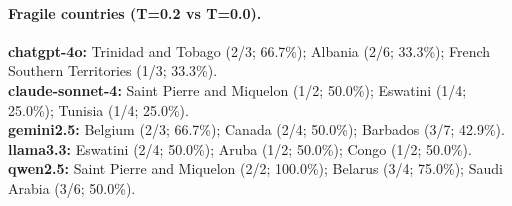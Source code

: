 \paragraph{Fragile countries (T=0.2 vs T=0.0).}
\textbf{chatgpt-4o:} Trinidad and Tobago (2/3; 66.7\%); Albania (2/6; 33.3\%); French Southern Territories (1/3; 33.3\%). \\ \textbf{claude-sonnet-4:} Saint Pierre and Miquelon (1/2; 50.0\%); Eswatini (1/4; 25.0\%); Tunisia (1/4; 25.0\%). \\ \textbf{gemini2.5:} Belgium (2/3; 66.7\%); Canada (2/4; 50.0\%); Barbados (3/7; 42.9\%). \\ \textbf{llama3.3:} Eswatini (2/4; 50.0\%); Aruba (1/2; 50.0\%); Congo (1/2; 50.0\%). \\ \textbf{qwen2.5:} Saint Pierre and Miquelon (2/2; 100.0\%); Belarus (3/4; 75.0\%); Saudi Arabia (3/6; 50.0\%). \\
